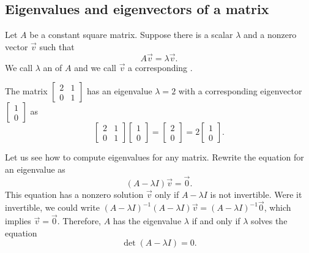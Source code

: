 \subsection{Eigenvalues and eigenvectors of a matrix}

Let $A$ be a constant square matrix.  Suppose there is a
scalar $\lambda$ and a nonzero vector $\vec{v}$ such that
\begin{equation*}
A \vec{v} = \lambda \vec{v}.
\end{equation*}
We call $\lambda$ an \emph{} of $A$ and we
call $\vec{v}$
a corresponding \emph{}.

\begin{example}
The matrix $\left[ \begin{smallmatrix}
2 & 1 \\
0 & 1
\end{smallmatrix} \right]$ has an eigenvalue $\lambda = 2$ with a
corresponding
eigenvector $\left[ \begin{smallmatrix}
1 \\ 0
\end{smallmatrix} \right]$ as
\begin{equation*}
\begin{bmatrix}
2 & 1 \\
0 & 1
\end{bmatrix}
\begin{bmatrix}
1 \\ 0
\end{bmatrix}
=
\begin{bmatrix}
2 \\
0 
\end{bmatrix}
=
2
\begin{bmatrix}
1 \\ 0
\end{bmatrix} .
\end{equation*}
\end{example}

Let us see how to compute eigenvalues for any matrix.
Rewrite the equation for an eigenvalue as
\begin{equation*}
(A - \lambda I)\vec{v} = \vec{0} .
\end{equation*}
This equation has a nonzero solution $\vec{v}$ only if 
$A - \lambda I$ is not invertible.  Were it invertible,
we could write
${(A - \lambda I)}^{-1}(A - \lambda I)\vec{v} = {(A-\lambda I)}^{-1}\vec{0}$,
which implies $\vec{v} = \vec{0}$.  Therefore,
$A$ has the
eigenvalue $\lambda$ if and only if $\lambda$ solves the equation
\begin{equation*}
\det (A-\lambda I) = 0 .
\end{equation*}

